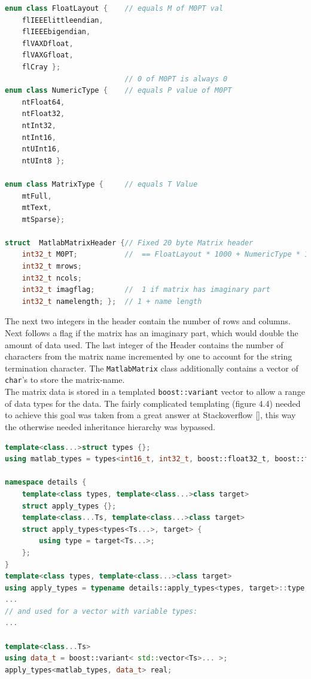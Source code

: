 \begin{lstlisting}[language=C++, caption=A code snippet showing the used enums and structs in the MATLAB header.]
enum class FloatLayout {  	// equals M of M0PT val
    flIEEElittleendian,
    flIEEEbigendian,
    flVAXDfloat,
    flVAXGfloat,
    flCray };
							// 0 of M0PT is always 0
enum class NumericType { 	// equals P value of M0PT
    ntFloat64,
    ntFloat32,
    ntInt32,
    ntInt16,
    ntUInt16,
    ntUInt8 };

enum class MatrixType {  	// equals T Value
    mtFull,
    mtText,
    mtSparse};

struct  MatlabMatrixHeader {// Fixed 20 byte Matrix header
    int32_t M0PT;  			//  == FloatLayout * 1000 + NumericType * 10 + MatrixType
    int32_t mrows;
    int32_t ncols;
    int32_t imagflag;   	//  1 if matrix has imaginary part
    int32_t namelength; }; 	// 1 + name length
\end{lstlisting}

The next two integers in the header contain the number of rows and columns. Next follows a flag if the matrix has an imaginary part, which would double the amount of data used. The last integer of the Header contains the number of characters from the matrix name incremented by one to account for the string termination character.
The \texttt{MatlabMatrix} class additionally contains a vector of \texttt{char}'s to store the matrix-name.\\
The matrix data is stored in a templated \texttt{boost::variant} vector to allow a range of data types for the data. The fairly complicated templating (figure 4.4) needed to achieve this goal was taken from  a great answer at Stackoverflow [], this way the otherwise needed inheritance hierarchy was bypassed. 
\begin{lstlisting}[language=C++, caption=A code snippet showing the templating to allow various types in a Boost variant.]
template<class...>struct types {};
using matlab_types = types<int16_t, int32_t, boost::float32_t, boost::float64_t, uint8_t, uint16_t>;

namespace details {
    template<class types, template<class...>class target>
    struct apply_types {};
    template<class...Ts, template<class...>class target>
    struct apply_types<types<Ts...>, target> {
        using type = target<Ts...>;
    };
}
template<class types, template<class...>class target>
using apply_types = typename details::apply_types<types, target>::type;
...
// and used for a vector with variable types:
...

template<class...Ts>
using data_t = boost::variant< std::vector<Ts>... >;
apply_types<matlab_types, data_t> real;
\end{lstlisting}
